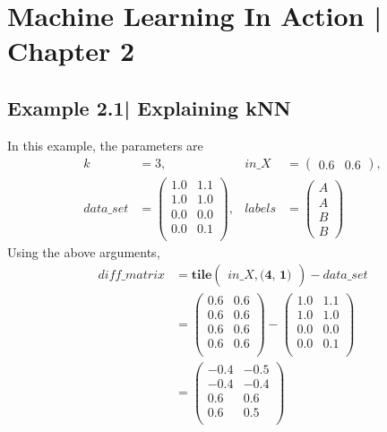 \documentclass[11pt]{article}
\begin{document}
\section*{Machine Learning In Action | Chapter 2}
\subsection*{Example 2.1| Explaining kNN}
In this example, the parameters are
\begin{align*}
k&=3,&
in\_X &= 
\begin{pmatrix}
0.6 & 0.6\end{pmatrix}, \\
data\_set &= 
\begin{pmatrix}
1.0&1.1\\1.0&1.0\\0.0&0.0\\0.0&0.1\\\end{pmatrix} , 
&labels &= 
\begin{pmatrix}A \\ A \\ B \\ B\end{pmatrix} 
\end{align*}
Using the above arguments, 
\begin{align*}
diff\_matrix &= 
\textbf{tile}\begin{pmatrix}
in\_X, \textbf{(4, 1)} 
\end{pmatrix}-  data\_set\\
&=\begin{pmatrix}
0.6&0.6\\0.6&0.6\\0.6&0.6\\0.6&0.6\\\end{pmatrix}
-
\begin{pmatrix}
1.0&1.1\\1.0&1.0\\0.0&0.0\\0.0&0.1\\\end{pmatrix}\\
&=
\begin{pmatrix}
-0.4&-0.5\\-0.4&-0.4\\0.6&0.6\\0.6&0.5\\\end{pmatrix}
\end{align*}
\end{document}
